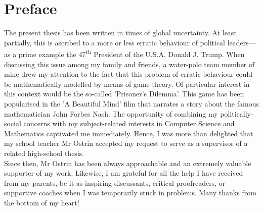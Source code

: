 \documentclass[11pt]{article}
\begin{document}
\section*{Preface}
The present thesis has been written in times of global uncertainty.
At least partially, this is ascribed to a more or less erratic behaviour of political leaders---as a prime example the 47\textsuperscript{th} President of the U.S.A. Donald J. Trump.
When discussing this issue among my family and friends, a water-polo team member of mine drew my attention to the fact that this problem of erratic behaviour could be mathematically modelled by means of game theory.
Of particular interest in this context would be the so-called 'Prisoner's Dilemma'.
This game has been popularised in the 'A Beautiful Mind' film that narrates a story about the famous mathematician John Forbes Nash.
The opportunity of combining my politically-social concerns with my subject-related interests in Computer Science and Mathematics captivated me immediately.
Hence, I was more than delighted that my school teacher Mr Ostrin accepted my request to serve as a supervisor of a related high-school thesis.\\
\indent Since then, Mr Ostrin has been always approachable and an extremely valuable supporter of my work.
Likewise, I am grateful for all the help I have received from my parents, be it as inspiring discussants, critical proofreaders, or supportive coaches when I was temporarily stuck in problems. Many thanks from the bottom of my heart!


\newpage

\tableofcontents
\newpage
\end{document}
